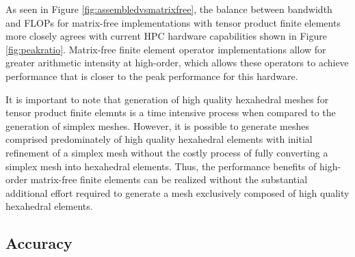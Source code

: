 As seen in Figure \ref{fig:assembledvsmatrixfree}, the balance between bandwidth and FLOPs for matrix-free implementations with tensor product finite elements more closely agrees with current HPC hardware capabilities shown in Figure \ref{fig:peakratio}.
Matrix-free finite element operator implementations allow for greater arithmetic intensity at high-order, which allows these operators to achieve performance that is closer to the peak performance for this hardware.

It is important to note that generation of high quality hexahedral meshes for tensor product finite elemnts is a time intensive process when compared to the generation of simplex meshes.
However, it is possible to generate meshes comprised predominately of high quality hexahedral elements with initial refinement of a simplex mesh without the costly process of fully converting a simplex mesh into hexahedral elements.
Thus, the performance benefits of high-order matrix-free finite elements can be realized without the substantial additional effort required to generate a mesh exclusively composed of high quality hexahedral elements.

\subsection{Accuracy}

